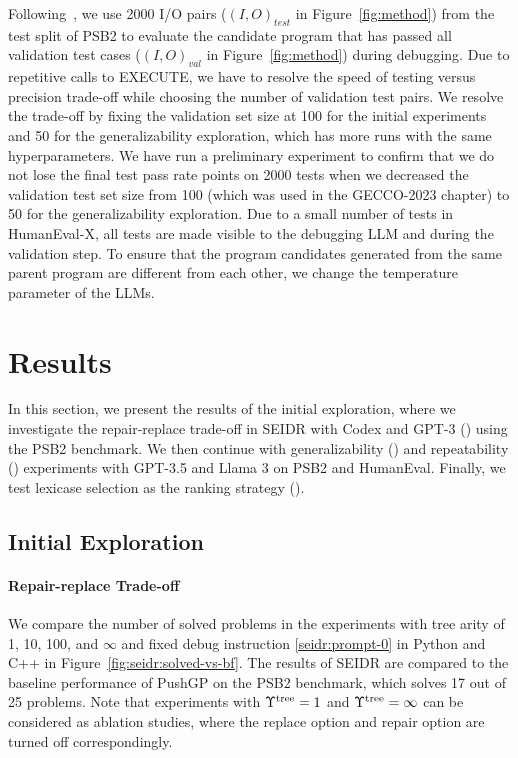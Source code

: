 Following~\cite{helmuthPSB2SecondProgram2021}, we use 2000 I/O pairs ($\left(I, O\right)_{test}$ in Figure~\ref{fig:method}) from the test split of PSB2 to evaluate the candidate program that has passed all validation test cases ($\left(I, O\right)_{val}$ in Figure~\ref{fig:method}) during debugging. 
Due to repetitive calls to EXECUTE, we have to resolve the speed of testing versus precision trade-off while choosing the number of validation test pairs.
We resolve the trade-off by fixing the validation set size at 100 for the initial experiments and 50 for the generalizability exploration, which has more runs with the same hyperparameters. 
We have run a preliminary experiment to confirm that we do not lose the final test pass rate points on 2000 tests when we decreased the validation test set size from 100 (which was used in the GECCO-2023  chapter) to 50 for the generalizability exploration.
Due to a small number of tests in HumanEval-X, all tests are made visible to the debugging LLM and during the validation step.  
To ensure that the program candidates generated from the same parent program are different from each other, we change the temperature parameter of the LLMs. 
 

\newpage\section{Results}
\label{sec:seidr-results}

In this section, we present the results of the initial exploration, where we investigate the repair-replace trade-off in SEIDR with Codex and GPT-3 (\rqtreearity{}) using the PSB2 benchmark.
We then continue with generalizability (\rqllama{}) and repeatability (\rqmultirun{}) experiments with GPT-3.5 and Llama 3 on PSB2 and HumanEval.
Finally, we test lexicase selection as the ranking strategy (\rqlexicase{}).

\subsection{Initial Exploration}

\paragraph{Repair-replace Trade-off}
\label{sec:seidr-seidr:rqtreearity}
We compare the number of solved problems in the experiments with tree arity of 1, 10, 100, and $\infty$ and fixed debug instruction \ref{seidr:prompt-0} in Python and C++ in Figure~\ref{fig:seidr:solved-vs-bf}. 
The results of SEIDR are compared to the baseline performance of PushGP on the PSB2 benchmark, which solves 17 out of 25 problems. 
Note that experiments with $\Upsilon^\text{tree}=1$ and $\Upsilon^\text{tree}=\infty$ can be considered as ablation studies, where the replace option and repair option are turned off correspondingly. 

